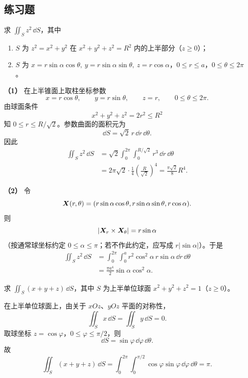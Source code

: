 \subsection{练习题}

\begin{xexercise}[1]
求 $\iint_S z^2\,\dd S$，其中
\begin{enumerate}[label=(\arabic*)]
\item $S$ 为 $z^2=x^2+y^2$ 在 $x^2+y^2+z^2=R^2$ 内的上半部分（$z\ge0$）；
\item $S$ 为 $x=r\sin\alpha\cos\theta,\ y=r\sin\alpha\sin\theta,\ z=r\cos\alpha$，$0\le r\le a$，$0\le\theta\le2\pi$。
\end{enumerate}
\end{xexercise}
\begin{xsolution}
\textbf{（1）}\quad
在上半锥面上取柱坐标参数
\[
  x=r\cos\theta,\qquad y=r\sin\theta,\qquad z=r,
  \qquad 0\le\theta\le2\pi.
\]
由球面条件
\[
  x^2+y^2+z^2=2r^2\le R^2
\]
知 $0\le r\le R/\sqrt2$。参数曲面的面积元为
\[
  \dd S=\sqrt2\,r\,\dd r\,\dd\theta.
\]
因此
\begin{align*}
\iint_S z^2\,\dd S
&=\sqrt2\int_0^{2\pi}\int_0^{R/\sqrt2}r^3\,\dd r\,\dd\theta\\
&=2\pi\sqrt2\cdot\frac14\left(\frac{R}{\sqrt2}\right)^4
=\frac{\pi\sqrt2}{8}R^4.
\end{align*}

\textbf{（2）}\quad
令
\[
  \bm{X}(r,\theta)
  =(r\sin\alpha\cos\theta,r\sin\alpha\sin\theta,r\cos\alpha).
\]
则
\[
  \left|\bm{X}_r\times\bm{X}_\theta\right|=r\sin\alpha
\]
（按通常球坐标约定 $0\le\alpha\le\pi$；若不作此约定，应写成 $r|\sin\alpha|$）。于是
\begin{align*}
\iint_S z^2\,\dd S
&=\int_0^{2\pi}\int_0^a r^2\cos^2\alpha\,r\sin\alpha\,\dd r\,\dd\theta\\
&=\frac{\pi a^4}{2}\sin\alpha\cos^2\alpha.
\end{align*}
\end{xsolution}


\begin{xexercise}[2]
求 $\iint_S(x+y+z)\,\dd S$，其中 $S$ 为上半单位球面 $x^2+y^2+z^2=1$（$z\ge0$）。
\end{xexercise}
\begin{xsolution}
在上半单位球面上，由关于 $xOz$、$yOz$ 平面的对称性，
\[
  \iint_Sx\,\dd S=\iint_Sy\,\dd S=0.
\]
取球坐标 $z=\cos\varphi$，$0\le\varphi\le\pi/2$，则
\[
  \dd S=\sin\varphi\,\dd\varphi\,\dd\theta.
\]
故
\[
  \iint_S(x+y+z)\,\dd S
  =\int_0^{2\pi}\int_0^{\pi/2}\cos\varphi\sin\varphi\,\dd\varphi\,\dd\theta
  =\pi.
\]
\end{xsolution}


